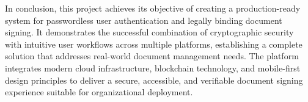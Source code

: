 In conclusion, this project achieves its objective of creating a production-ready system for passwordless user authentication and legally binding document signing. It demonstrates the successful combination of cryptographic security with intuitive user workflows across multiple platforms, establishing a complete solution that addresses real-world document management needs. The platform integrates modern cloud infrastructure, blockchain technology, and mobile-first design principles to deliver a secure, accessible, and verifiable document signing experience suitable for organizational deployment.